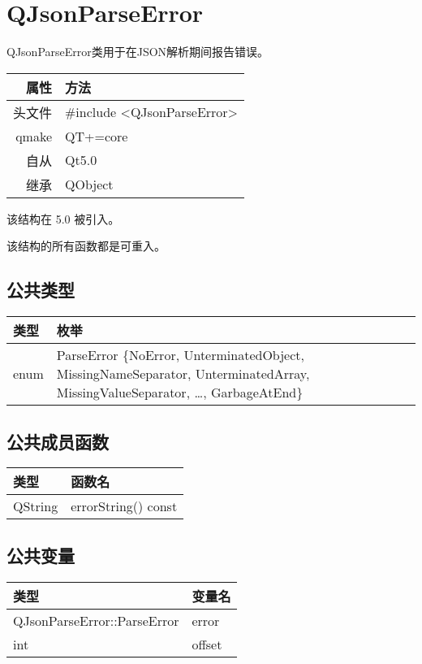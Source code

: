 \chapter{QJsonParseError}

QJsonParseError类用于在JSON解析期间报告错误。

\begin{tabular}{|r|l|}
	\hline
	属性 & 方法 \\
	\hline
	头文件 & \#include <QJsonParseError>\\      
	\hline
	qmake & QT+=core\\      
	\hline
	自从 & Qt5.0\\
	\hline
	继承&QObject \\
	\hline
\end{tabular}

该结构在 5.0 被引入。

\begin{notice}
该结构的所有函数都是可重入。
\end{notice}

\section{公共类型}

\begin{tabular}{|l|m{26em}|}
	\hline
	类型& 	枚举\\
\hline
enum &	ParseError \{NoError, UnterminatedObject, MissingNameSeparator, UnterminatedArray, MissingValueSeparator, …, GarbageAtEnd\}\\
	\hline
\end{tabular}


\section{公共成员函数}


\begin{tabular}{|l|l|}
	\hline
类型 &	函数名\\
\hline
QString &	errorString() const\\
	\hline
\end{tabular}


\section{公共变量}

\begin{tabular}{|l|l|}
\hline
类型 	&变量名\\
\hline
QJsonParseError::ParseError& 	error\\
\hline
int 	&offset\\
\hline
\end{tabular}


